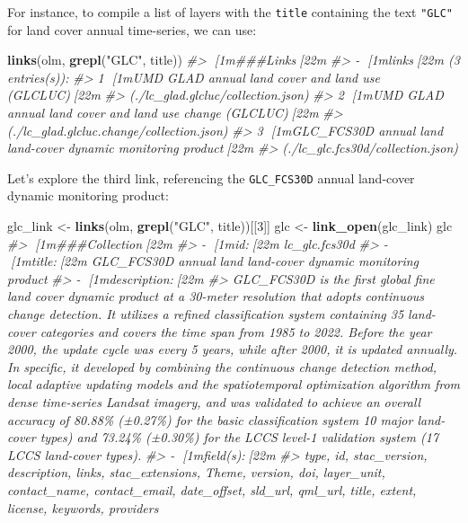 \documentclass[
  graybox,natbib,nospthms]{svmono}
\newenvironment{Shaded}{\begin{snugshade}}{\end{snugshade}}
\newcommand{\CommentTok}[1]{\textcolor[rgb]{0.37,0.37,0.37}{\textit{#1}}}
\newcommand{\DecValTok}[1]{\textcolor[rgb]{0.06,0.06,0.06}{#1}}
\newcommand{\FunctionTok}[1]{\textcolor[rgb]{0.27,0.27,0.27}{\textbf{#1}}}
\newcommand{\NormalTok}[1]{#1}
\newcommand{\OtherTok}[1]{\textcolor[rgb]{0.37,0.37,0.37}{#1}}
\newcommand{\StringTok}[1]{\textcolor[rgb]{0.5,0.5,0.5}{#1}}
\begin{document}
For instance, to compile a list of layers with the \texttt{title} containing the text \texttt{"GLC"} for land cover annual time-series, we can use:

\begin{Shaded}
\begin{Highlighting}[]
\FunctionTok{links}\NormalTok{(olm, }\FunctionTok{grepl}\NormalTok{(}\StringTok{"GLC"}\NormalTok{, title))}
\CommentTok{\#\textgreater{} [1m\#\#\#Links[22m}
\CommentTok{\#\textgreater{} {-} [1mlinks[22m (3 entries(s)):}
\CommentTok{\#\textgreater{} 1 [1mUMD GLAD annual land cover and land use (GLCLUC)[22m }
\CommentTok{\#\textgreater{} (./lc\_glad.glcluc/collection.json)}
\CommentTok{\#\textgreater{} 2 [1mUMD GLAD annual land cover and land use change (GLCLUC)[22m }
\CommentTok{\#\textgreater{} (./lc\_glad.glcluc.change/collection.json)}
\CommentTok{\#\textgreater{} 3 [1mGLC\_FCS30D annual land land{-}cover dynamic monitoring product[22m }
\CommentTok{\#\textgreater{} (./lc\_glc.fcs30d/collection.json)}
\end{Highlighting}
\end{Shaded}

Let's explore the third link, referencing the \texttt{GLC\_FCS30D} annual land-cover dynamic monitoring product:

\begin{Shaded}
\begin{Highlighting}[]
\NormalTok{glc\_link }\OtherTok{\textless{}{-}} \FunctionTok{links}\NormalTok{(olm, }\FunctionTok{grepl}\NormalTok{(}\StringTok{"GLC"}\NormalTok{, title))[[}\DecValTok{3}\NormalTok{]]}
\NormalTok{glc }\OtherTok{\textless{}{-}} \FunctionTok{link\_open}\NormalTok{(glc\_link)}
\NormalTok{glc}
\CommentTok{\#\textgreater{} [1m\#\#\#Collection[22m}
\CommentTok{\#\textgreater{} {-} [1mid:[22m lc\_glc.fcs30d}
\CommentTok{\#\textgreater{} {-} [1mtitle:[22m GLC\_FCS30D annual land land{-}cover dynamic monitoring product}
\CommentTok{\#\textgreater{} {-} [1mdescription:[22m }
\CommentTok{\#\textgreater{} GLC\_FCS30D is the first global fine land cover dynamic product at a 30{-}meter resolution that adopts continuous change detection. It utilizes a refined classification system containing 35 land{-}cover categories and covers the time span from 1985 to 2022. Before the year 2000, the update cycle was every 5 years, while after 2000, it is updated annually. In specific, it developed by combining the continuous change detection method, local adaptive updating models and the spatiotemporal optimization algorithm from dense time{-}series Landsat imagery, and was validated to achieve an overall accuracy of 80.88\% (±0.27\%) for the basic classification system 10 major land{-}cover types) and 73.24\% (±0.30\%) for the LCCS level{-}1 validation system (17 LCCS land{-}cover types).}
\CommentTok{\#\textgreater{} {-} [1mfield(s):[22m }
\CommentTok{\#\textgreater{} type, id, stac\_version, description, links, stac\_extensions, Theme, version, doi, layer\_unit, contact\_name, contact\_email, date\_offset, sld\_url, qml\_url, title, extent, license, keywords, providers}
\end{Highlighting}
\end{Shaded}
\end{document}
